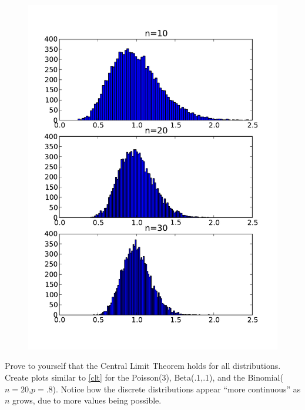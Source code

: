 \begin{figure}[h]
\label{CLT}
\centering
\includegraphics[width=\textwidth]{multiplot.pdf}
\end{figure}


\begin{problem}
Prove to yourself that the Central Limit Theorem holds for all distributions.  Create plots similar to \ref{clt} for the Poisson(3), Beta(.1,.1), and the Binomial($n=20$,$p=.8$). Notice how the discrete distributions appear ``more continuous'' as $n$ grows, due to more values being possible. 
\end{problem}


